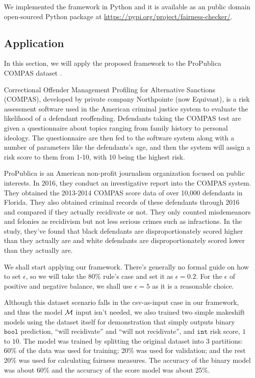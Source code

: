 \documentclass[conference]{IEEEtran}
\begin{document}
We implemented the framework in Python and it is available as an public domain open-sourced Python package at \url{https://pypi.org/project/fairness-checker/}.

\subsection{Application}
\label{sec:app}
In this section, we will apply the proposed framework to the ProPublica COMPAS dataset \cite{angwin2016machine,larson2016compas,larson2016propublica}.

Correctional Offender Management Profiling for Alternative Sanctions (COMPAS), developed by private company Northpointe (now Equivant), is a risk assessment software used in the American criminal justice system to evaluate the likelihood of a defendant reoffending. Defendants taking the COMPAS test are given a questionnaire about topics ranging from family history to personal ideology. The questionnaire are then fed to the software system along with a number of parameters like the defendants's age, and then the system will assign a risk score to them from 1-10, with 10 being the highest risk.

ProPublica is an American non-profit journalism organization focused on public interests. In 2016, they conduct an investigative report into the COMPAS system. They obtained the 2013-2014 COMPAS score data of over 10,000 defendants in Florida. They also obtained criminal records of these defendants through 2016 and compared if they actually recidivate or not. They only counted misdemeanors and felonies as recidivism but not less serious crimes such as infractions. In the study, they've found that black defendants are disproportionately scored higher than they actually are and white defendants are disproportionately scored lower than they actually are.

We shall start applying our framework. There's generally no formal guide on how to set $\epsilon$, so we will take the 80\% rule's case and set it as $\epsilon = 0.2$. For the $\epsilon$ of positive and negative balance, we shall use $\epsilon = 5$ as it is a reasonable choice.

Although this dataset scenario falls in the csv-as-input case in our framework, and thus the model $\mathcal{M}$ input isn't needed, we also trained two simple makeshift models using the dataset itself for demonstration that simply outputs binary $\mathtt{bool}$ prediction, ``will recidivate'' and ``will not recidivate'', and $\mathtt{int}$ risk score, $1$ to $10$. The model was trained by splitting the original dataset into 3 partitions: 60\% of the data was used for training; 20\% was used for validation; and the rest 20\% was used for calculating fairness measures. The accuracy of the binary model was about 60\% and the accuracy of the score model was about 25\%.
\end{document}
